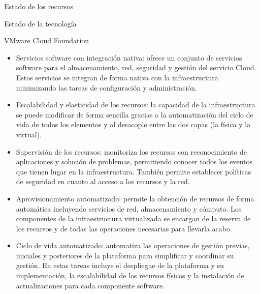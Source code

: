 \begin{chapter}{Estado de los recursos}
\begin{section}{Estado de la tecnología}
\begin{subsection}{VMware Cloud Foundation}
\begin{itemize}

    \item Servicios software con integración nativa: ofrece un conjunto de servicios software para el almacenamiento, red, seguridad y gestión del servicio Cloud. Estos servicios se integran de forma nativa con la infraestructura minimizando las tareas de configuración y administración.

    \item Escalabilidad y elasticidad de los recursos: la capacidad de la infraestructura se puede modificar de forma sencilla gracias a la automatización del ciclo de vida de todos los elementos y al desacople entre las dos capas (la física y la virtual).

    \item Supervisión de los recursos: monitoriza los recursos con reconocimiento de aplicaciones y solución de problemas, permitiendo conocer todos los eventos que tienen lugar en la infraestructura. También permite establecer políticas de seguridad en cuanto al acceso a los recursos y la red.

    \item Aprovisionamiento automatizado: permite la obtención de recursos de forma automática incluyendo servicios de red, almacenamiento y cómputo. Los componentes de la infraestructura virtualizada se encargan de la reserva de los recursos y de todas las operaciones necesarias para llevarla acabo.

    \item Ciclo de vida automatizado: automatiza las operaciones de gestión previas, iniciales y posteriores de la plataforma para simplificar y coordinar su gestión. En estas tareas incluye el despliegue de la plataforma y su implementación, la escalabilidad de los recursos físicos y la instalación de actualizaciones para cada componente software.


\end{itemize}
\end{subsection}
\end{section}
\end{chapter}

